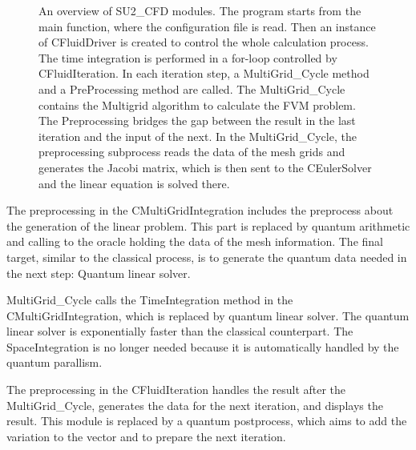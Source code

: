 \documentclass[%
 reprint,
 amsmath,amssymb,
pra,
]{revtex4-1}
\begin{document}
\begin{figure}[htbp]
     \caption{An overview of SU2\_CFD modules. The program starts from the main function, where the configuration file is read. Then an instance of CFluidDriver is created to control the whole calculation process. The time integration is performed in a for-loop controlled by CFluidIteration. In each iteration step, a MultiGrid\_Cycle method and a PreProcessing method are called. The MultiGrid\_Cycle contains the Multigrid algorithm to calculate the FVM problem. The Preprocessing bridges the gap between the result in the last iteration and the input of the next. In the MultiGrid\_Cycle, the preprocessing subprocess reads the data of the mesh grids and generates the Jacobi matrix, which is then sent to the CEulerSolver and the linear equation is solved there.}
    \label{SU2modules}
\end{figure}

The preprocessing in the CMultiGridIntegration includes the preprocess about the generation of the linear problem. This part is replaced by quantum arithmetic and calling to the oracle holding the data of the mesh information. The final target, similar to the classical process, is to generate the quantum data needed in the next step: Quantum linear solver.

MultiGrid\_Cycle calls the TimeIntegration method in the CMultiGridIntegration, which is replaced by quantum linear solver. The quantum linear solver is exponentially faster than the classical counterpart. The SpaceIntegration is no longer needed because it is automatically handled by the quantum parallism.

The preprocessing in the CFluidIteration handles the result after the MultiGrid\_Cycle, generates the data for the next iteration, and displays the result. This module is replaced by a quantum postprocess, which aims to add the variation to the vector and to prepare the next iteration. 
\end{document}
